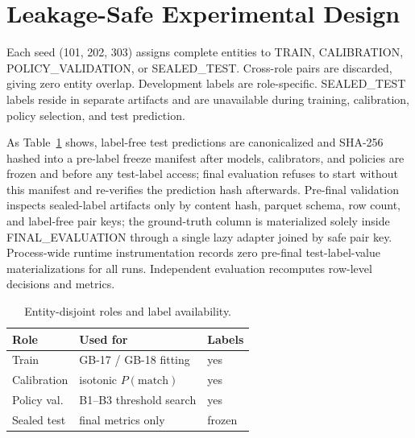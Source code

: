 \documentclass[conference]{IEEEtran}
\begin{document}
\section{Leakage-Safe Experimental Design}
Each seed (101, 202, 303) assigns complete entities to TRAIN, CALIBRATION, POLICY\_VALIDATION, or SEALED\_TEST. Cross-role pairs are discarded, giving zero entity overlap. Development labels are role-specific. SEALED\_TEST labels reside in separate artifacts and are unavailable during training, calibration, policy selection, and test prediction.

As Table~\ref{tab:roles} shows, label-free test predictions are canonicalized and SHA-256 hashed into a pre-label freeze manifest after models, calibrators, and policies are frozen and before any test-label access; final evaluation refuses to start without this manifest and re-verifies the prediction hash afterwards. Pre-final validation inspects sealed-label artifacts only by content hash, parquet schema, row count, and label-free pair keys; the ground-truth column is materialized solely inside FINAL\_EVALUATION through a single lazy adapter joined by safe pair key. Process-wide runtime instrumentation records zero pre-final test-label-value materializations for all runs. Independent evaluation recomputes row-level decisions and metrics.

\begin{table}[t]
\caption{Entity-disjoint roles and label availability.}
\label{tab:roles}
\centering
\setlength{\tabcolsep}{3pt}
\begin{tabular}{p{}p{}p{}}
\toprule
Role & Used for & Labels\\
\midrule
Train & GB-17 / GB-18 fitting & yes\\
Calibration & isotonic $P(\mathrm{match})$ & yes\\
Policy val. & B1--B3 threshold search & yes\\
Sealed test & final metrics only & frozen\\
\bottomrule
\end{tabular}
\end{table}
\end{document}
